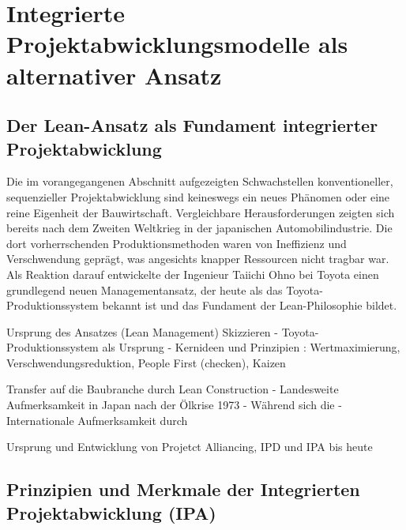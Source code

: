 \clearpage

\section{Integrierte Projektabwicklungsmodelle als alternativer Ansatz}
\label{sec: 2.2}


\subsection{Der Lean-Ansatz als Fundament integrierter Projektabwicklung}
\label{sec:2.2.1}


Die im vorangegangenen Abschnitt aufgezeigten Schwachstellen konventioneller, sequenzieller Projektabwicklung sind keineswegs ein neues Phänomen oder eine reine Eigenheit der Bauwirtschaft. Vergleichbare Herausforderungen zeigten sich bereits nach dem Zweiten Weltkrieg in der japanischen Automobilindustrie. Die dort vorherrschenden Produktionsmethoden waren von Ineffizienz und Verschwendung geprägt, was angesichts knapper Ressourcen nicht tragbar war. Als Reaktion darauf entwickelte der Ingenieur Taiichi Ohno bei Toyota einen grundlegend neuen Managementansatz, der heute als das Toyota-Produktionssystem bekannt ist und das Fundament der Lean-Philosophie bildet.

Ursprung des Ansatzes (Lean Management) Skizzieren
- Toyota-Produktionssystem\autocite[]{ohno_toyota-produktionssystem_2013} als Ursprung
- Kernideen und Prinzipien : Wertmaximierung, Verschwendungsreduktion, People First (checken), Kaizen

Transfer auf die Baubranche durch Lean Construction
- Landesweite Aufmerksamkeit in Japan nach der Ölkrise 1973
- Während sich die 
- Internationale Aufmerksamkeit durch 

Ursprung und Entwicklung von Projetct Alliancing, IPD und IPA bis heute

\subsection{Prinzipien und Merkmale der Integrierten Projektabwicklung (IPA)}
\label{sec:2.2.2}


